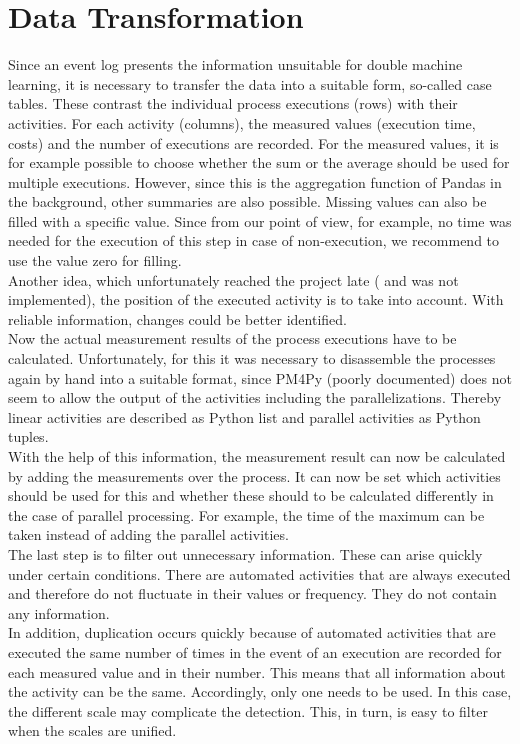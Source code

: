     \section{Data Transformation}
    Since an event log presents the information unsuitable for double machine learning, it is necessary to transfer the data into a suitable form, so-called case tables. These contrast the individual process executions (rows) with their activities. For each activity (columns), the measured values (execution time, costs) and the number of executions are recorded. For the measured values, it is for example possible to choose whether the sum or the average should be used for multiple executions. However, since this is the aggregation function of Pandas in the background, other summaries are also possible. Missing values can also be filled with a specific value. Since from our point of view, for example, no time was needed for the execution of this step in case of non-execution, we recommend to use the value zero for filling.\\
    Another idea, which unfortunately reached the project late ( and was not implemented), the position of the executed activity is to take into account. With reliable information, changes could be better identified.\\
    Now the actual measurement results of the process executions have to be calculated. Unfortunately, for this it was necessary to disassemble the processes again by hand into a suitable format, since PM4Py (poorly documented) does not seem to allow the output of the activities including the parallelizations. Thereby linear activities are described as Python list and parallel activities as Python tuples.\\
    With the help of this information, the measurement result can now be calculated by adding the measurements over the process. It can now be set which activities should be used for this and whether these should to be calculated differently in the case of parallel processing. For example, the time of the maximum can be taken instead of adding the parallel activities.\\
    The last step is to filter out unnecessary information. These can arise quickly under certain conditions. There are automated activities that are always executed and therefore do not fluctuate in their values or frequency. They do not contain any information.\\
    In addition, duplication occurs quickly because of automated activities that are executed the same number of times in the event of an execution are recorded for each measured value and in their number. This means that all information about the activity can be the same. Accordingly, only one needs to be used. In this case, the different scale may complicate the detection. This, in turn, is easy to filter when the scales are unified.\\
